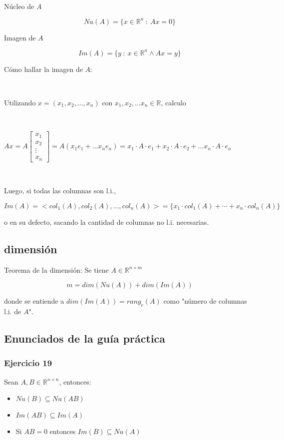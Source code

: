 \

Núcleo de $A$

\[Nu(A) = \{x \in \mathbb{R}^{n} ~:~ Ax = 0\}\]

Imagen de $A$

\[Im(A) = \{y ~:~ x \in \mathbb{R}^{n} \land Ax = y\}\]

Cómo hallar la imagen de $A$:

\

Utilizando $x = (x_1, x_2, \ldots, x_n)$ con $x_1,x_2,\ldots x_n \in \mathbb{R}$, calculo 

\

$Ax = A\begin{bmatrix}
x_1 \\
x_2 \\
\vdots \\
x_n
\end{bmatrix} = A(x_1 e_1 + \ldots x_n e_n) =
x_1\cdot A\cdot e_1 + x_2\cdot A\cdot e_2 + \ldots x_n\cdot A\cdot e_n$

\

Luego, si todas las columnas son l.i., 

\[Im(A) = <col_1(A), col_2(A),\ldots, col_n(A)> = \{x_1\cdot col_1(A) + \cdots + x_n \cdot col_n(A)\}\]

o en su defecto, sacando la cantidad de columnas no l.i. necesarias.

\subsection{dimensión}\label{subsec:dimension_matriz}

Teorema de la dimensión: Se tiene $A \in \mathbb{R}^{n \times m}$

\[m = dim(Nu(A)) + dim(Im(A))\]

donde se entiende a $dim(Im(A)) = rang_c(A)$ como "número de columnas l.i. de $A$".

\newpage

\subsection{Enunciados de la guía práctica}\label{subsec:enunciados_guia_1}

\subsubsection{Ejercicio 19}\label{subsubsec:guia_1_ej_19}

Sean $A,B \in \mathbb{R}^{n \times n}$, entonces:
\begin{itemize}
    \item $Nu(B) \subseteq Nu(AB)$
    \item $Im(AB) \subseteq Im(A)$
    \item Si $AB = 0$ entonces $Im(B) \subseteq Nu(A)$
\end{itemize}

